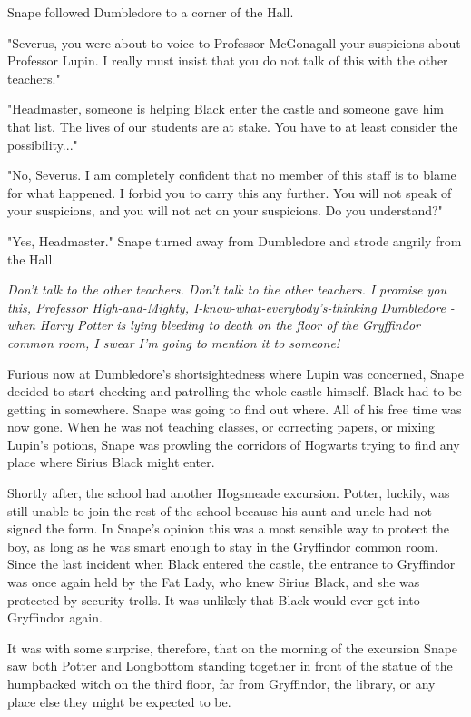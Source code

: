 \documentclass[a4paper,11pt]{article}
\begin{document}
Snape followed Dumbledore to a corner of the Hall.

"Severus, you were about to voice to Professor McGonagall your suspicions about Professor Lupin. I really must insist that you do not talk of this with the other teachers."

"Headmaster, someone is helping Black enter the castle and someone gave him that list. The lives of our students are at stake. You have to at least consider the possibility..."

"No, Severus. I am completely confident that no member of this staff is to blame for what happened. I forbid you to carry this any further. You will not speak of your suspicions, and you will not act on your suspicions. Do you understand?"

"Yes, Headmaster." Snape turned away from Dumbledore and strode angrily from the Hall.

\emph{Don't talk to the other teachers. Don't talk to the other teachers. I promise you this, Professor High-and-Mighty, I-know-what-everybody's-thinking Dumbledore - when Harry Potter is lying bleeding to death on the floor of the Gryffindor common room, I swear I'm going to mention it to someone!}

Furious now at Dumbledore's shortsightedness where Lupin was concerned, Snape decided to start checking and patrolling the whole castle himself. Black had to be getting in somewhere. Snape was going to find out where. All of his free time was now gone. When he was not teaching classes, or correcting papers, or mixing Lupin's potions, Snape was prowling the corridors of Hogwarts trying to find any place where Sirius Black might enter.

Shortly after, the school had another Hogsmeade excursion. Potter, luckily, was still unable to join the rest of the school because his aunt and uncle had not signed the form. In Snape's opinion this was a most sensible way to protect the boy, as long as he was smart enough to stay in the Gryffindor common room. Since the last incident when Black entered the castle, the entrance to Gryffindor was once again held by the Fat Lady, who knew Sirius Black, and she was protected by security trolls. It was unlikely that Black would ever get into Gryffindor again.

It was with some surprise, therefore, that on the morning of the excursion Snape saw both Potter and Longbottom standing together in front of the statue of the humpbacked witch on the third floor, far from Gryffindor, the library, or any place else they might be expected to be.
\end{document}
